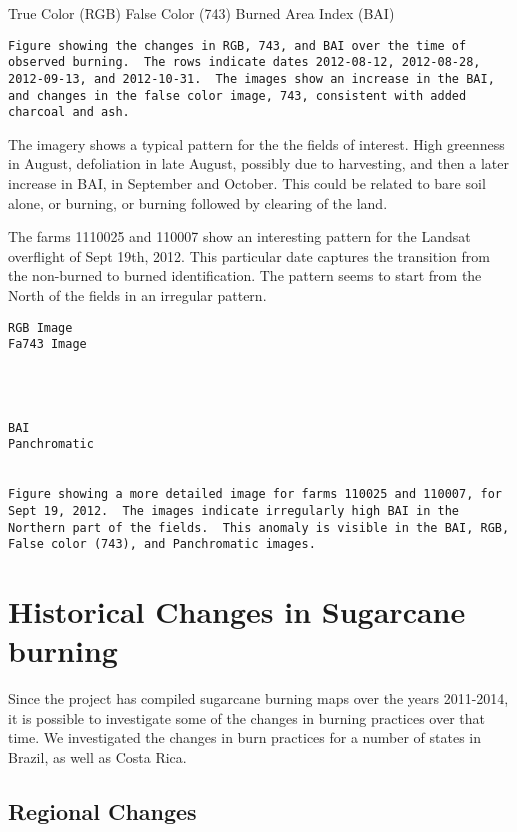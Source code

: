 \documentclass[]{article}
\begin{document}
True Color (RGB) False Color (743) Burned Area Index (BAI)

\begin{verbatim}
Figure showing the changes in RGB, 743, and BAI over the time of observed burning.  The rows indicate dates 2012-08-12, 2012-08-28, 2012-09-13, and 2012-10-31.  The images show an increase in the BAI, and changes in the false color image, 743, consistent with added  charcoal and ash.
\end{verbatim}

The imagery shows a typical pattern for the the fields of interest. High
greenness in August, defoliation in late August, possibly due to
harvesting, and then a later increase in BAI, in September and October.
This could be related to bare soil alone, or burning, or burning
followed by clearing of the land.

The farms 1110025 and 110007 show an interesting pattern for the Landsat
overflight of Sept 19th, 2012. This particular date captures the
transition from the non-burned to burned identification. The pattern
seems to start from the North of the fields in an irregular pattern.

\begin{verbatim}
RGB Image
Fa743 Image
  



BAI
Panchromatic


Figure showing a more detailed image for farms 110025 and 110007, for Sept 19, 2012.  The images indicate irregularly high BAI in the Northern part of the fields.  This anomaly is visible in the BAI, RGB, False color (743), and Panchromatic images.
\end{verbatim}

\section{Historical Changes in Sugarcane
burning}\label{historical-changes-in-sugarcane-burning}

Since the project has compiled sugarcane burning maps over the years
2011-2014, it is possible to investigate some of the changes in burning
practices over that time. We investigated the changes in burn practices
for a number of states in Brazil, as well as Costa Rica.

\subsection{Regional Changes}\label{regional-changes}
\end{document}
